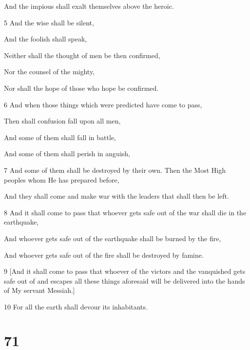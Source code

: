 \par And the impious shall exalt themselves above the heroic.

\par 5 And the wise shall be silent,

\par And the foolish shall speak,

\par Neither shall the thought of men be then confirmed,

\par Nor the counsel of the mighty,

\par Nor shall the hope of those who hope be confirmed.

\par 6 And when those things which were predicted have come to pass,

\par Then shall confusion fall upon all men,

\par And some of them shall fall in battle,

\par And some of them shall perish in anguish,

\par 7 And some of them shall be destroyed by their own. Then the Most High peoples whom He has prepared before,

\par And they shall come and make war with the leaders that shall then be left.

\par 8 And it shall come to pass that whoever gets safe out of the war shall die in the earthquake,

\par And whoever gets safe out of the earthquake shall be burned by the fire,

\par And whoever gets safe out of the fire shall be destroyed by famine.

\par 9 [And it shall come to pass that whoever of the victors and the vanquished gets safe out of and escapes all these things aforesaid will be delivered into the hands of My servant Messiah.] 

\par 10 For all the earth shall devour its inhabitants.

\chapter{71}


